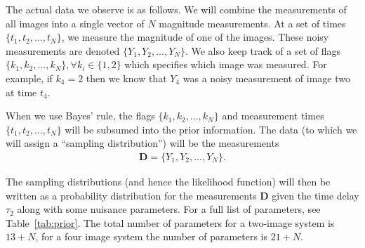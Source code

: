 \documentclass[useAMS,usenatbib, a4paper]{mn2e} \usepackage{natbib}
\newcommand{\data}{\boldsymbol{D}}
\begin{document}
The actual data we observe is as follows. We will combine the measurements of all
images into a single vector of $N$ magnitude measurements.
At a set of times
$\{t_1, t_2, ..., t_N\}$, we measure the magnitude of one of the images. These
noisy measurements are denoted $\{Y_1, Y_2, ..., Y_N\}$. We also keep track of
a set of flags $\{k_1, k_2, ..., k_N\}, \forall k_i \in \{1, 2\}$ which specifies
which image was measured. For example, if $k_4 = 2$ then we know that $Y_4$ was
a noisy measurement of image two at time $t_4$.

When we use Bayes' rule, the flags $\{k_1, k_2, ..., k_N\}$ and measurement
times $\{t_1, t_2, ..., t_N\}$ will be subsumed into the prior information. The
data (to which we will assign a ``sampling distribution'') will be the
measurements
\begin{eqnarray}
\boldsymbol{D} = \{Y_1, Y_2, ..., Y_N\}.
\end{eqnarray}

The sampling distributions (and hence the likelihood function) will then be
written as a probability distribution for the measurements $\data$
given the time delay $\tau_2$ along with some nuisance parameters. For a full
list of parameters, see Table~\ref{tab:prior}. The total number of parameters
for a two-image system is $13+N$, for a four image system the number of
parameters is $21+N$.
\end{document}
